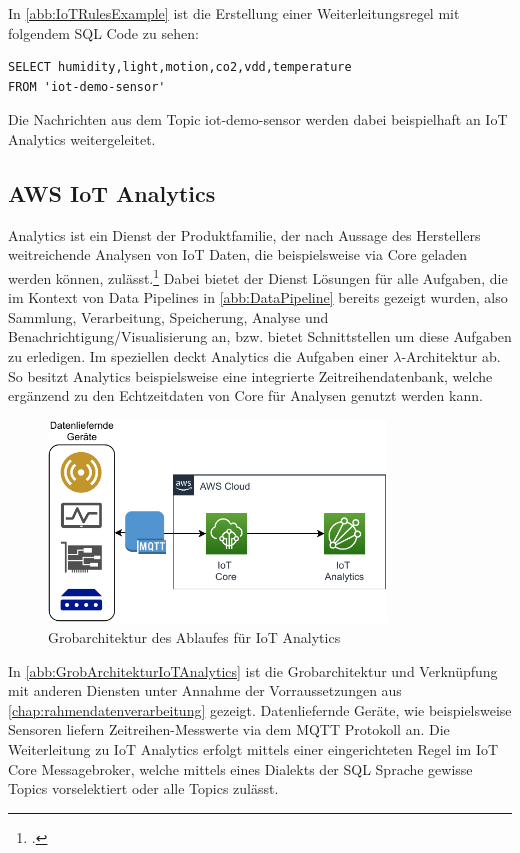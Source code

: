 In \autoref{abb:IoTRulesExample} ist die Erstellung einer Weiterleitungsregel mit folgendem SQL Code zu sehen:
\lstset{language=SQL} 
\begin{lstlisting}
SELECT humidity,light,motion,co2,vdd,temperature 
FROM 'iot-demo-sensor'
\end{lstlisting}
Die Nachrichten aus dem Topic iot-demo-sensor werden dabei beispielhaft an IoT Analytics weitergeleitet.

\subsection{AWS IoT Analytics} \label{productselection:iotanalytics}
\AWSIOT Analytics ist ein Dienst der \AWSIOT Produktfamilie, der nach Aussage des Herstellers weitreichende Analysen von \ac{IoT} Daten, die beispielsweise via \AWSIOT Core geladen werden können, zulässt.\footcite[Vgl. auch im Folgenden][]{AmazonWebServicesInc..o.J.c} Dabei bietet der Dienst Lösungen für alle Aufgaben, die im Kontext von Data Pipelines in \autoref{abb:DataPipeline} bereits gezeigt wurden, also Sammlung, Verarbeitung, Speicherung, Analyse und Benachrichtigung/Visualisierung an, bzw. bietet Schnittstellen um diese Aufgaben zu erledigen. Im speziellen deckt \AWSIOT Analytics die Aufgaben einer $\lambda$-Architektur ab. So besitzt \AWSIOT Analytics beispielsweise eine integrierte Zeitreihendatenbank, welche ergänzend zu den Echtzeitdaten von \AWSIOT Core für Analysen genutzt werden kann.
\begin{figure}[H]
\centering
\includegraphics[width=0.8\textwidth]{graphics/IoT-Analytics-general.pdf}
\caption{Grobarchitektur des Ablaufes für IoT Analytics}
\label{abb:GrobArchitekturIoTAnalytics}
\end{figure}
In \autoref{abb:GrobArchitekturIoTAnalytics} ist die Grobarchitektur und Verknüpfung mit anderen Diensten unter Annahme der Vorraussetzungen aus \autoref{chap:rahmendatenverarbeitung} gezeigt. Datenliefernde Geräte, wie beispielsweise Sensoren liefern Zeitreihen-Messwerte via dem \ac{MQTT} Protokoll an. Die Weiterleitung zu IoT Analytics erfolgt mittels einer eingerichteten Regel im \ac{IoT} Core Messagebroker, welche mittels eines Dialekts der SQL Sprache gewisse Topics vorselektiert oder alle Topics zulässt.

